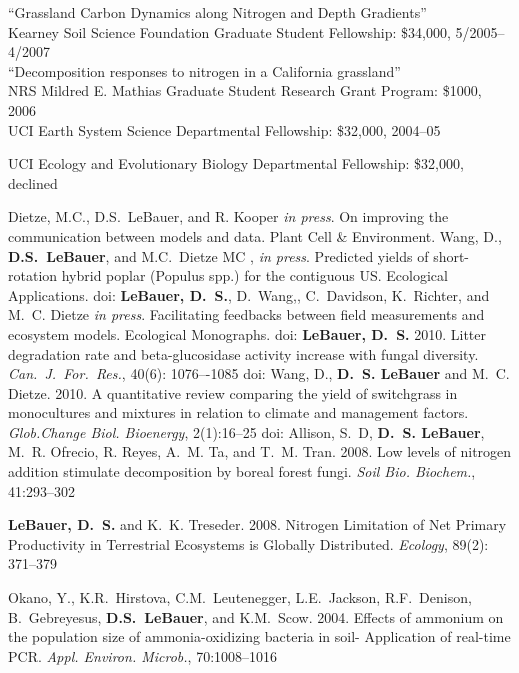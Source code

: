 \documentclass{xetexCV}
\begin{document}
\vspace{1}
``Grassland Carbon Dynamics along Nitrogen and Depth Gradients'' \\
Kearney Soil Science Foundation Graduate Student Fellowship:  \$34,000, 5/2005--4/2007 \\ 

\vspace{1}
``Decomposition responses to nitrogen in a California grassland'' \\
NRS Mildred E. Mathias Graduate Student Research Grant Program: \$1000, 2006 \\

\vspace{1}
 UCI Earth System Science Departmental Fellowship: \$32,000, 2004--05

\vspace{1}
 UCI Ecology and Evolutionary Biology Departmental Fellowship: \$32,000, declined
\pagebreak


Dietze, M.C., D.S.~LeBauer, and R. Kooper \textit{in press}. On improving the communication between models and data. Plant Cell \& Environment.
\medskip
Wang, D., \textbf{D.S.~LeBauer}, and M.C.~Dietze MC , \textit{in press}. Predicted yields of short-rotation hybrid poplar (Populus spp.) for the contiguous US. Ecological Applications. doi: 
\medskip
\textbf{LeBauer, D.~S.}, D.~Wang,, C.~Davidson, K.~Richter, and M.~C. Dietze \textit{in press}. Facilitating feedbacks between field measurements and ecosystem models. Ecological Monographs. doi:
\medskip
\textbf{LeBauer, D.~S.} 2010. Litter degradation rate and beta-glucosidase activity increase with fungal diversity. \textit{Can.\ J.\ For.\ Res.}, 40(6): 1076–-1085 doi:
\medskip
Wang, D., \textbf{D.~S. LeBauer} and M.~C. Dietze. 2010. A quantitative review comparing the yield of switchgrass in monocultures and mixtures in relation to climate and management factors. \textit{Glob.Change Biol. Bioenergy}, 2(1):16--25 doi:
\medskip
Allison, S.~D, \textbf{D.~S. LeBauer}, M.~R. Ofrecio, R. Reyes, A.~M. Ta, and T.~M. Tran. 2008. Low levels of nitrogen addition stimulate decomposition by boreal forest fungi. \textit{Soil Bio. Biochem.}, 41:293--302

\medskip
\textbf{LeBauer, D.~S.} and K.~K. Treseder. 2008. Nitrogen Limitation of Net Primary Productivity in Terrestrial Ecosystems is Globally Distributed. \textit{Ecology}, 89(2): 371--379

\medskip
Okano, Y., K.R.~Hirstova, C.M.~Leutenegger, L.E.~Jackson, R.F.~Denison, B.~Gebreyesus, \textbf{D.S.~LeBauer}, and K.M.~Scow. 2004. Effects of ammonium on the population size of ammonia-oxidizing bacteria in soil- Application of real-time PCR. \textit{Appl. Environ. Microb.}, 70:1008--1016
\end{document}
